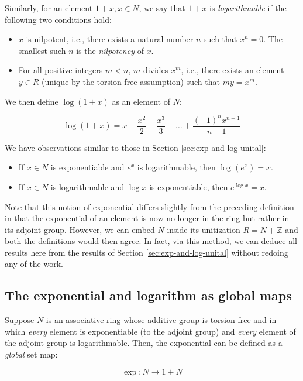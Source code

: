 \documentclass{ucetd}
\begin{document}
Similarly, for an element $1 + x, x \in N$, we say that $1 + x$ is
{\em logarithmable} if the following two conditions hold:

\begin{itemize}
\item $x$ is nilpotent, i.e., there exists a natural number $n$ such
  that $x^n = 0$. The smallest such $n$ is the {\em nilpotency} of $x$.
\item For all positive integers $m < n$, $m$ divides $x^m$, i.e.,
  there exists an element $y \in R$ (unique by the torsion-free
  assumption) such that $my = x^m$.
\end{itemize}

We then define $\log(1 + x)$ as an element of $N$:

$$\log(1 + x) = x - \frac{x^2}{2} + \frac{x^3}{3} - \dots + \frac{(-1)^nx^{n-1}}{n - 1}$$

We have observations similar to those in Section \ref{sec:exp-and-log-unital}:

\begin{itemize}
\item If $x \in N$ is exponentiable and $e^x$ is logarithmable, then
  $\log(e^x) = x$.
\item If $x \in N$ is logarithmable and $\log x$ is exponentiable, then
  $e^{\log x} = x$.
\end{itemize}

Note that this notion of exponential differs slightly from the
preceding definition in that the exponential of an element is now no
longer in the ring but rather in its adjoint group. However, we can
embed $N$ inside its unitization $R = N + \mathbb{Z}$ and both the
definitions would then agree. In fact, via this method, we can deduce
all results here from the results of Section
\ref{sec:exp-and-log-unital} without redoing any of the work.

\subsection{The exponential and logarithm as global maps}\label{sec:exp-log-global}

Suppose $N$ is an associative ring whose additive group is
torsion-free and in which {\em every} element is exponentiable (to the
adjoint group) and {\em every} element of the adjoint group is
logarithmable. Then, the exponential can be defined as a {\em global}
set map:

$$\exp:N \to 1 + N$$
\end{document}
